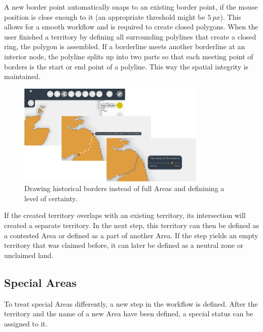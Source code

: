 A new border point automatically snaps to an existing border point, if the mouse position is close enough to it (an appropriate threshold might be $5~px$). This allows for a smooth workflow and is required to create closed polygons. When the user finished a territory by defining all surrounding polylines that create a closed ring, the polygon is assembled. If a borderline meets another borderline at an interior node, the polyline splits up into two parts so that each meeting point of borders is the start or end point of a polyline. This way the spatial integrity is maintained.

\begin{figure}[ht]
  \vspace{1em}
  \centering
  \includegraphics[width = 0.8\textwidth]{graphics/extensions/new_territory_tool}
  \caption{Drawing historical borders instead of full Areas and definining a level of certainty.}
  \label{fig:uncertainty_new_territory_tool}
\end{figure}

If the created territory overlaps with an existing territory, its intersection will created a separate territory. In the next step, this territory can then be defined as a contested Area or defined as a part of another Area. If the step yields an empty territory that was claimed before, it can later be defined as a neutral zone or unclaimed land.


\subsection{Special Areas} %
\label{sub:special_areas}

To treat special Areas differently, a new step in the workflow is defined. After the territory and the name of a new Area have been defined, a special status can be assigned to it.

